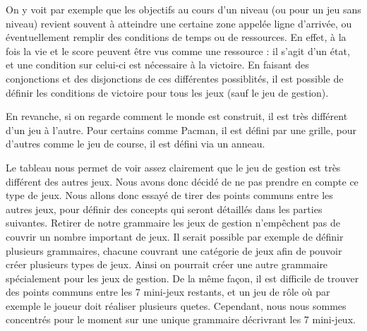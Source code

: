 On y voit par exemple que les objectifs au cours d'un niveau (ou pour un jeu sans niveau) revient souvent à atteindre une certaine zone
appelée ligne d'arrivée, ou éventuellement remplir des conditions de temps ou de ressources. En effet, à la fois la vie et le score
peuvent être vus comme une ressource : il s'agit d'un état, et une condition sur celui-ci est nécessaire à la victoire.
En faisant des conjonctions et des disjonctions de ces différentes possiblités, il est possible de définir 
les conditions de victoire pour tous les jeux (sauf le jeu de gestion).

En revanche, si on regarde comment le monde est construit, il est très différent d'un jeu à l'autre.
Pour certains comme Pacman, il est défini par une grille, pour d'autres comme le jeu de course, il est défini via un anneau.

Le tableau nous permet de voir assez clairement que le jeu de gestion est très différent des autres jeux.
Nous avons donc décidé de ne pas prendre en compte ce type de jeux.
Nous allons donc essayé de tirer des points communs entre les autres jeux, pour définir des concepts qui seront détaillés dans 
les parties suivantes.
Retirer de notre grammaire les jeux de gestion n'empêchent pas de couvrir un nombre important de jeux.
Il serait possible par exemple de définir plusieurs grammaires, chacune couvrant une catégorie de jeux afin de pouvoir
créer plusieurs types de jeux. Ainsi on pourrait créer une autre grammaire spécialement pour les jeux de gestion.
De la même façon, il est difficile de trouver des points communs entre les 7 mini-jeux restants, et un jeu de rôle où par exemple le joueur
doit réaliser plusieurs quetes.
Cependant, nous nous sommes concentrés pour le moment sur une unique grammaire décrivrant les 7 mini-jeux.

